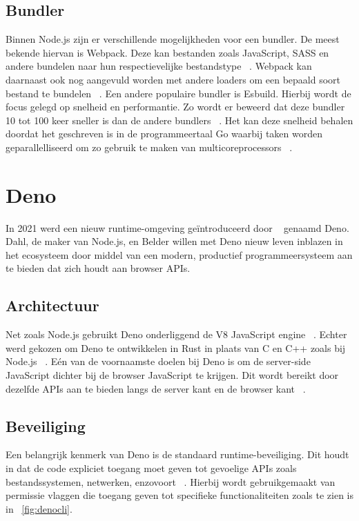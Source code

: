 \subsection{Bundler}
Binnen Node.js zijn er verschillende mogelijkheden voor een bundler. De meest bekende hiervan is Webpack. 
Deze kan bestanden zoals JavaScript, SASS en andere bundelen naar hun respectievelijke bestandstype ~\autocite{Laurila2020}. 
Webpack kan daarnaast ook nog aangevuld worden met andere loaders om een bepaald soort bestand te bundelen ~\autocite{Laurila2020}. Een andere populaire bundler is Esbuild.
Hierbij wordt de focus gelegd op snelheid en performantie. Zo wordt er beweerd dat deze bundler 10 tot 100 keer sneller is dan de andere bundlers ~\autocite{Couriol2020}.
Het kan deze snelheid behalen doordat het geschreven is in de programmeertaal Go waarbij taken worden geparallelliseerd om zo gebruik te maken van multicoreprocessors ~\autocite{Couriol2020}.

\section{Deno}
In 2021 werd een nieuw runtime-omgeving geïntroduceerd door ~\textcite{Dahl2021} genaamd Deno.
Dahl, de maker van Node.js, en Belder willen met Deno nieuw leven inblazen in het ecosysteem door middel van een
modern, productief programmeersysteem aan te bieden dat zich houdt aan browser APIs.

\subsection{Architectuur}
Net zoals Node.js gebruikt Deno onderliggend de V8 JavaScript engine ~\autocite{DenoLand2023}. 
Echter werd gekozen om Deno te ontwikkelen in Rust in plaats van C en C++ zoals bij Node.js ~\autocite{DenoLand2023}.
Eén van de voornaamste doelen bij Deno is om de server-side JavaScript dichter bij de browser JavaScript te krijgen.
Dit wordt bereikt door dezelfde APIs aan te bieden langs de server kant en de browser kant ~\autocite{Barrow2022}.

\subsection{Beveiliging}
Een belangrijk kenmerk van Deno is de standaard runtime-beveiliging.
Dit houdt in dat de code expliciet toegang moet geven tot gevoelige APIs zoals bestandssystemen, netwerken, enzovoort ~\autocite{DenoLand2023}. 
Hierbij wordt gebruikgemaakt van permissie vlaggen die toegang geven tot specifieke functionaliteiten zoals te zien is in ~\ref{fig:denocli}.

